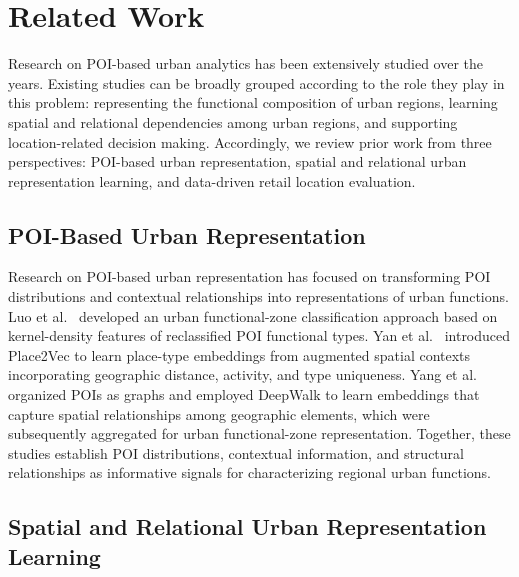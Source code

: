 \documentclass[sigconf]{acmart}
\begin{document}
\section{Related Work}

Research on POI-based urban analytics has been extensively studied over the years. Existing studies can be broadly grouped according to the role they play in this problem: representing the functional composition of urban regions, learning spatial and relational dependencies among urban regions, and supporting location-related decision making. Accordingly, we review prior work from three perspectives: POI-based urban representation, spatial and relational urban representation learning, and data-driven retail location evaluation.

\subsection{POI-Based Urban Representation}

Research on POI-based urban representation has focused on transforming POI distributions and contextual relationships into representations of urban functions. Luo et al.~\cite{luo2023urban} developed an urban functional-zone classification approach based on kernel-density features of reclassified POI functional types. Yan et al.~\cite{yan2017place2vec} introduced Place2Vec to learn place-type embeddings from augmented spatial contexts incorporating geographic distance, activity, and type uniqueness. Yang et al.~\cite{yang2023classifying} organized POIs as graphs and employed DeepWalk to learn embeddings that capture spatial relationships among geographic elements, which were subsequently aggregated for urban functional-zone representation. Together, these studies establish POI distributions, contextual information, and structural relationships as informative signals for characterizing regional urban functions.

\subsection{Spatial and Relational Urban Representation Learning}
\end{document}

